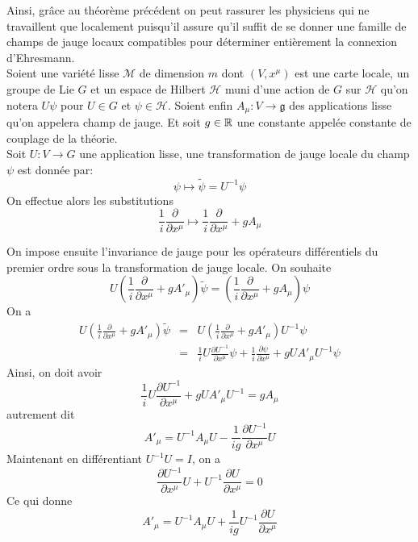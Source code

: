 \documentclass[12pt, a4paper]{book}
\begin{document}
Ainsi, grâce au théorème précédent on peut rassurer les physiciens qui ne travaillent que localement puisqu'il assure qu'il suffit de se donner une famille de champs de jauge locaux compatibles pour déterminer entièrement la connexion d'Ehresmann. \\

Soient une variété lisse $\mathcal{M}$ de dimension $m$ dont $(V, x^\mu)$ est une carte locale, un groupe de Lie $G$ et un espace de Hilbert $\mathcal{H}$ muni d'une action de $G$ sur $\mathcal{H}$ qu'on notera $U\psi$ pour $U \in G$ et $\psi \in \mathcal{H}$. Soient enfin $A_\mu : V \to \mathfrak{g}$ des applications lisse qu'on appelera champ de jauge. Et soit $g\in \mathbb{R}$ une constante appelée constante de couplage de la théorie. \\

Soit $U: V\to G$ une application lisse, une transformation de jauge locale du champ $\psi$ est donnée par:
$$\psi \mapsto \tilde{\psi} = U^{-1}\psi$$
On effectue alors les substitutions
$$\frac{1}{i}\frac{\partial}{\partial x^\mu} \mapsto \frac{1}{i}\frac{\partial}{\partial x^\mu} + g A_\mu$$

On impose ensuite l'invariance de jauge pour les opérateurs différentiels du premier ordre sous la transformation de jauge locale. On souhaite
$$U\left(\frac{1}{i}\frac{\partial}{\partial x^\mu} + g A'_\mu\right)\tilde{\psi} = \left(\frac{1}{i}\frac{\partial}{\partial x^\mu} + g A_\mu\right)\psi$$
On a 
\begin{eqnarray*}
U\left(\frac{1}{i}\frac{\partial}{\partial x^\mu} + g A'_\mu\right)\tilde{\psi} &=& U\left(\frac{1}{i}\frac{\partial}{\partial x^\mu} + g A'_\mu\right)U^{-1}\psi \\
&=& \frac{1}{i}U\frac{\partial U^{-1}}{\partial x^\mu}\psi + \frac{1}{i}\frac{\partial \psi}{\partial x^\mu} + gUA'_\mu U^{-1}\psi
\end{eqnarray*}
Ainsi, on doit avoir
$$\frac{1}{i}U\frac{\partial U^{-1}}{\partial x^\mu} + gUA'_\mu U^{-1} = gA_\mu$$
autrement dit
$$A'_\mu = U^{-1}A_\mu U - \frac{1}{ig}\frac{\partial U^{-1}}{\partial x^\mu}U$$
Maintenant en différentiant $U^{-1}U = I$, on a 
$$\frac{\partial U^{-1}}{\partial x^\mu}U + U^{-1}\frac{\partial U}{\partial x^\mu} = 0$$
Ce qui donne 
$$A'_\mu = U^{-1}A_\mu U + \frac{1}{ig}U^{-1}\frac{\partial U}{\partial x^\mu}$$ 
\end{document}
